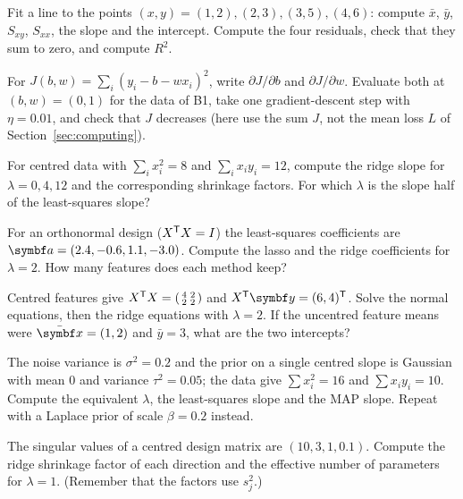 \documentclass[11pt]{article}
\newcommand{\y}{\vect{y}}
\begin{document}
\begin{questions}
\begin{calculations}
\item Fit a line to the points $(x, y) = (1, 2), (2, 3), (3, 5), (4, 6)$: compute $\bar x$, $\bar y$, $S_{xy}$, $S_{xx}$,
the slope and the intercept. Compute the four residuals, check that they sum to zero, and compute $R^2$.
\item For $J(b, w) = \sum_i (y_i - b - wx_i)^2$, write $\partial J/\partial b$ and $\partial J/\partial w$. Evaluate both
at $(b, w) = (0, 1)$ for the data of B1, take one gradient-descent step with $\eta = 0.01$, and check that $J$ decreases
(here use the sum $J$, not the mean loss $L$ of Section~\ref{sec:computing}).
\item For centred data with $\sum_i x_i^2 = 8$ and $\sum_i x_i y_i = 12$, compute the ridge slope for $\lambda = 0, 4, 12$
and the corresponding shrinkage factors. For which $\lambda$ is the slope half of the least-squares slope?
\item For an orthonormal design ($X^{\mathsf{T}} X = I$) the least-squares coefficients are $\vect{a} = (2.4, -0.6, 1.1, -3.0)$.
Compute the lasso and the ridge coefficients for $\lambda = 2$. How many features does each method keep?
\item Centred features give $X^{\mathsf{T}} X = \begin{psmallmatrix} 4 & 2 \\ 2 & 2 \end{psmallmatrix}$ and $X\T\y =
(6, 4)\T$. Solve the normal equations, then the ridge equations with $\lambda = 2$. If the uncentred feature means were
$\bar{\x} = (1, 2)$ and $\bar y = 3$, what are the two intercepts?
\item The noise variance is $\sigma^2 = 0.2$ and the prior on a single centred slope is Gaussian with mean $0$ and
variance $\tau^2 = 0.05$; the data give
$\sum x_i^2 = 16$ and $\sum x_i y_i = 10$. Compute the equivalent $\lambda$, the least-squares slope and the MAP slope. Repeat
with a Laplace prior of scale $\beta = 0.2$ instead.
\item The singular values of a centred design matrix are $(10, 3, 1, 0.1)$. Compute the ridge shrinkage factor of each
direction and the effective number of parameters for $\lambda = 1$. (Remember that the factors use $s_j^2$.)
\end{calculations}


\end{questions}
\end{document}
